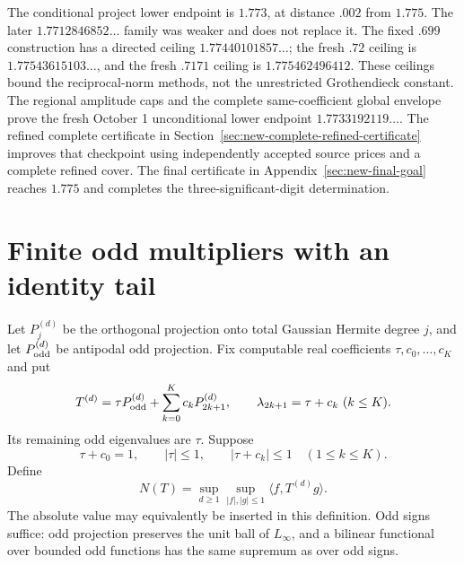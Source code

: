 \documentclass[11pt]{article}
\begin{document}
The conditional project lower endpoint is $1.773$, at distance $.002$ from
$1.775$. The later $1.7712846852\ldots$ family was weaker and does not
replace it. The fixed $.699$ construction has a directed ceiling
$1.77440101857\ldots$; the fresh $.72$ ceiling is
$1.77543615103\ldots$, and the fresh $.7171$ ceiling is
$1.775462496412$. These ceilings bound the reciprocal-norm methods,
not the unrestricted Grothendieck constant. The regional amplitude
caps and the complete same-coefficient global envelope prove the fresh
October 1 unconditional lower endpoint $1.7733192119\ldots$.
The refined complete certificate in Section~\ref{sec:new-complete-refined-certificate}
improves that checkpoint using independently accepted source prices and
a complete refined cover. The final certificate in
Appendix~\ref{sec:new-final-goal} reaches $1.775$ and completes the
three-significant-digit determination.

\section{Finite odd multipliers with an identity tail}
Let $P_j^{(d)}$ be the orthogonal projection onto total Gaussian Hermite
degree $j$, and let $P_{\rm odd}^{(d)}$ be antipodal odd projection.
Fix computable real coefficients $\tau,c_0,\ldots,c_K$ and put
\[
 T^{(d)}=\tau P_{\rm odd}^{(d)}+
                 \sum_{k=0}^Kc_kP_{2k+1}^{(d)},\qquad
 \lambda_{2k+1}=\tau+c_k\ (k\leq K).
\]
Its remaining odd eigenvalues are $\tau$.  Suppose
\begin{equation}\label{eq:new-odd-spectral-cube}
 \tau+c_0=1,\qquad |\tau|\leq1,\qquad
                    |\tau+c_k|\leq1\quad(1\leq k\leq K).
\end{equation}
Define
\[
 N(T)=\sup_{d\geq1}\sup_{|f|,|g|\leq1}
             \langle f,T^{(d)}g\rangle.
\]
The absolute value may equivalently be inserted in this definition.
Odd signs suffice: odd projection preserves the unit ball of $L_\infty$,
and a bilinear functional over bounded odd functions has the same
supremum as over odd signs.
\end{document}
